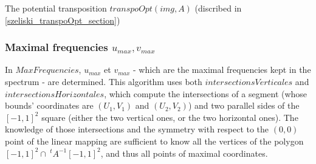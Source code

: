    \begin{algorithme}
    \caption{The potential transposition $transpoOpt(img,A)$ (discribed in \ref{szeliski_transpoOpt_section})}
    \label{szeliski_transpoOpt}
   \end{algorithme}

 \subsubsection{Maximal frequencies $u_{max}, v_{max}$}

In $MaxFrequencies$, $u_{max}$ et $v_{max}$ - which are the maximal frequencies kept in the spectrum - are determined. This algorithm uses both $intersectionsVerticales$ and $intersectionsHorizontales$, which compute the intersections of a segment (whose bounds' coordinates are $(U_1,V_1)$ and $(U_2,V_2)$) and two parallel sides of the $[-1,1]^2$ square (either the two vertical ones, or the two horizontal ones). The knowledge of those intersections and the symmetry with respect to the $(0,0)$ point of the linear mapping are sufficient to know all the vertices of the polygon $[-1,1]^2 \cap \ ^t\!\!A^{-1}[-1,1]^2$, and thus all points of maximal coordinates.
 
  

